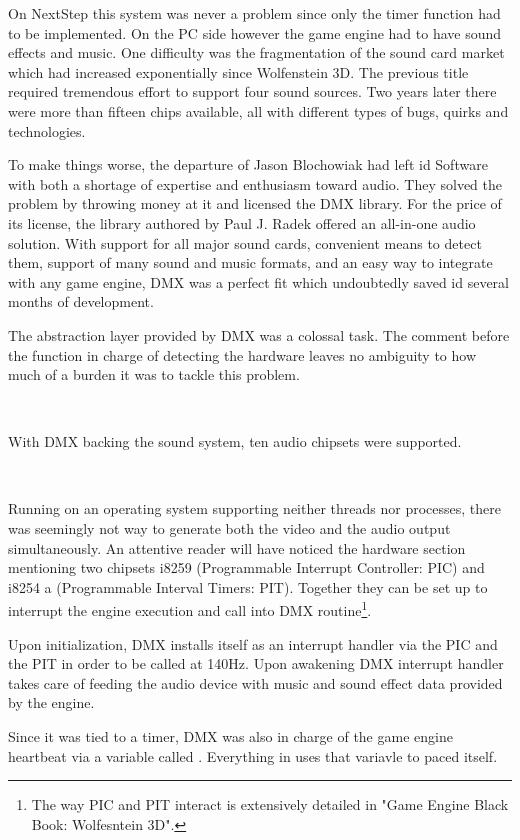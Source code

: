 On NextStep this system was never a problem since only the timer function had to be implemented. On the PC side however the game engine had to have sound effects and music. One difficulty was the fragmentation of the sound card market which had increased exponentially since Wolfenstein 3D. The previous title required tremendous effort to support four sound sources. Two years later there were more than fifteen chips available, all with different types of bugs, quirks and technologies.\\
\par
To make things worse, the departure of Jason Blochowiak had left id Software with both a shortage of expertise and enthusiasm toward audio. They solved the problem by throwing money at it and licensed the DMX library. For the price of its license, the library authored by Paul J. Radek offered an all-in-one audio solution. With support for all major sound cards, convenient means to detect them, support of many sound and music formats, and an easy way to integrate with any game engine, DMX was a perfect fit which undoubtedly saved id several months of development.





The abstraction layer provided by DMX was a colossal task. The comment before the function in charge of detecting the hardware leaves no ambiguity to how much of a burden it was to tackle this problem.\\
\par
{}\\
\par
With DMX backing the sound system, ten audio chipsets were supported.\\
\par
{}\\
\par
Running on an operating system supporting neither threads nor processes, there was seemingly not way to generate both the video and the audio output simultaneously. An attentive reader will have noticed the hardware section mentioning two chipsets i8259 (Programmable Interrupt Controller: PIC) and i8254 a (Programmable Interval Timers: PIT). Together they can be set up to interrupt the engine execution and call into DMX routine\footnote{The way PIC and PIT interact is extensively detailed in "Game Engine Black Book: Wolfesntein 3D".}.\\
\par
Upon initialization, DMX installs itself as an interrupt handler via the PIC and the PIT in order to be called at 140Hz. Upon awakening DMX interrupt handler takes care of feeding the audio device with music and sound effect data provided by the engine.\\
\par
Since it was tied to a timer, DMX was also in charge of the game engine heartbeat via a variable called . Everything in \doom{} uses that variavle to paced itself.
\par



